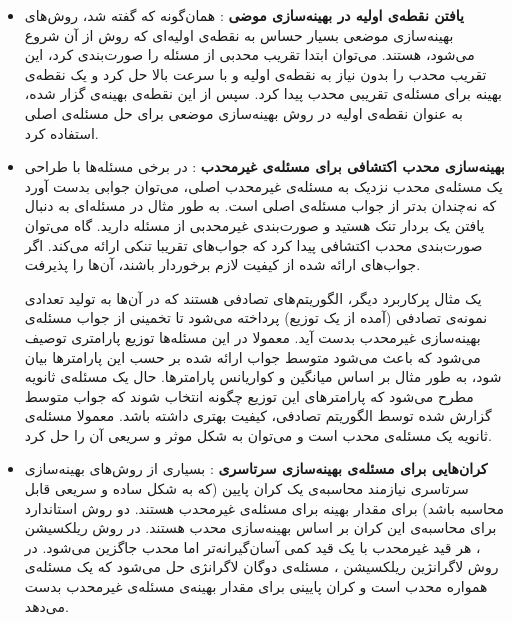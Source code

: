 \begin{itemize}
\item \textbf{
یافتن نقطه‌ی اولیه در بهینه‌سازی موضی
}:
همان‌گونه که گفته شد، روش‌های بهینه‌سازی موضعی بسیار حساس به نقطه‌ی اولیه‌ای که روش از آن شروع می‌شود، هستند. می‌توان ابتدا تقریب محدبی از مسئله را صورت‌بندی کرد، این تقریب محدب را بدون نیاز به نقطه‌ی اولیه و با سرعت بالا حل کرد و یک نقطه‌ی بهینه برای مسئله‌ی تقریبی محدب پیدا کرد. سپس از این نقطه‌ی بهینه‌ی گزار شده، به عنوان نقطه‌ی اولیه در روش بهینه‌سازی موضعی برای حل مسئله‌ی اصلی استفاده کرد.

\item \textbf{
بهینه‌سازی محدب اکتشافی
برای مسئله‌ی غیرمحدب
}:
در برخی مسئله‌ها با طراحی یک مسئله‌ی محدب نزدیک به مسئله‌ی غیرمحدب اصلی، می‌توان جوابی بدست آورد که نه‌چندان بدتر از جواب مسئله‌ی اصلی است. به طور مثال در مسئله‌ای به دنبال یافتن یک بردار تنک
هستید و صورت‌بندی غیرمحدبی از مسئله دارید. گاه می‌توان صورت‌بندی محدب اکتشافی پیدا کرد که جواب‌های تقریبا تنکی ارائه می‌کند. اگر جواب‌های ارائه شده از کیفیت لازم برخوردار باشند، آن‌ها را پذیرفت.

یک مثال پرکاربرد دیگر، الگوریتم‌های تصادفی
هستند که در آن‌ها به تولید تعدادی نمونه‌ی تصادفی (آمده از یک توزیع) پرداخته می‌شود تا تخمینی از جواب مسئله‌ی بهینه‌سازی غیرمحدب بدست آید. معمولا در این مسئله‌ها توزیع پارامتری توصیف می‌شود که باعث می‌شود متوسط جواب ارائه شده بر حسب این پارامترها بیان شود، به طور مثال بر اساس میانگین و کواریانس
پارامترها. حال یک مسئله‌ی ثانویه مطرح می‌شود که پارامترهای این توزیع چگونه انتخاب شوند که جواب متوسط گزارش شده توسط الگوریتم تصادفی، کیفیت بهتری داشته باشد. معمولا مسئله‌ی ثانویه یک مسئله‌ی محدب است و می‌توان به شکل موثر و سریعی آن را حل کرد.

\item\textbf{
کران‌هایی برای مسئله‌ی بهینه‌سازی سرتاسری
}:
بسیاری از روش‌های بهینه‌سازی سرتاسری نیازمند محاسبه‌ی یک کران پایین (که به شکل ساده و سریعی قابل محاسبه باشد) برای مقدار بهینه برای مسئله‌ی غیرمحدب هستند. دو روش استاندارد برای محاسبه‌ی این کران بر اساس بهینه‌سازی محدب هستند. در روش ریلکسیشن
،
هر قید غیرمحدب با یک قید کمی آسان‌گیرانه‌تر اما محدب جاگزین می‌شود. در روش لاگرانژین ریلکسیشن
،
مسئله‌ی دوگان لاگرانژی
حل می‌شود که یک مسئله‌ی همواره محدب است و کران پایینی برای مقدار بهینه‌ی مسئله‌ی غیرمحدب بدست می‌دهد.


\end{itemize}



































